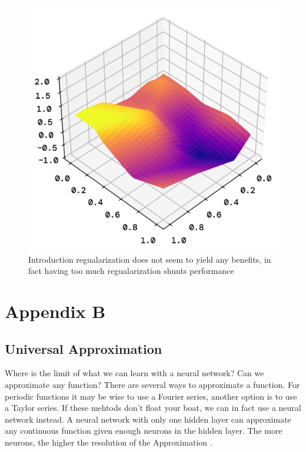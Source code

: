 \documentclass[twoside,11pt]{report}
\begin{document}
\begin{figure}[!ht]
\begin{minipage}[t]{0.5\textwidth - 1mm}
\begin{center}
                \includegraphics[width=\textwidth]{../runsAndFigures/perlinNoise_NN_pred.png}
            \end{center}
            \caption{Introduction regualarization does not seem to yield any benefits, in fact
            having too much regualarization shunts performance}\label{fig:accuracy_aplha}
        \end{minipage}
    \end{figure}











\chapter*{Appendix B}
\label{app:appendixB}


\section{Universal Approximation}
\label{sec:UAT}

    Where is the limit of what we can learn with a neural network? Can we approximate any function?
    There are several ways to approximate a function. For periodic functions it may be wise to use a Fourier series,
    another option is to use a Taylor series. If these mehtods don't float your boat, we can in fact use a neural network
    instead. A neural network with only one hidden layer can approximate any continuous function
    given enough neurons in the hidden layer. The more neurons, the higher the resolution of the Approximation
    \cite{HornikEtAl89}. 
\end{document}
